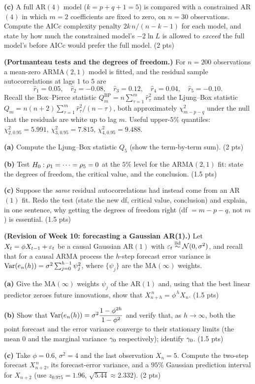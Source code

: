 \documentclass[11pt]{article}
\begin{document}
\textbf{(c)} A full AR$(4)$ model ($k=p+q+1=5$) is compared with a constrained AR$(4)$ in which $m=2$ coefficients are fixed to zero, on $n=30$ observations. Compute the AICc complexity penalty $2k\,n/(n-k-1)$ for each model, and state by how much the constrained model's $-2\ln L$ is allowed to \emph{exceed} the full model's before AICc would prefer the full model. \hfill(2 pts)
\answerpage

\textbf{(Portmanteau tests and the degrees of freedom.)} For $n=200$ observations a mean-zero ARMA$(2,1)$ model is fitted, and the residual sample autocorrelations at lags $1$ to $5$ are
\[
\hat r_1=0.05,\quad \hat r_2=-0.08,\quad \hat r_3=0.12,\quad \hat r_4=0.04,\quad \hat r_5=-0.10 .
\]
Recall the Box--Pierce statistic $Q_m^{\mathrm{BP}}=n\sum_{\tau=1}^m\hat r_\tau^2$ and the Ljung--Box statistic $Q_m=n(n+2)\sum_{\tau=1}^m\hat r_\tau^2/(n-\tau)$, both approximately $\chi^2_{m-p-q}$ under the null that the residuals are white up to lag $m$. Useful upper-$5\%$ quantiles: $\chi^2_{2,0.95}=5.991$, $\chi^2_{3,0.95}=7.815$, $\chi^2_{4,0.95}=9.488$.

\textbf{(a)} Compute the Ljung--Box statistic $Q_5$ (show the term-by-term sum). \hfill(2 pts)

\textbf{(b)} Test $H_0:\rho_1=\cdots=\rho_5=0$ at the $5\%$ level for the ARMA$(2,1)$ fit: state the degrees of freedom, the critical value, and the conclusion. \hfill(1.5 pts)

\textbf{(c)} Suppose the \emph{same} residual autocorrelations had instead come from an AR$(1)$ fit. Redo the test (state the new df, critical value, conclusion) and explain, in one sentence, why getting the degrees of freedom right (df $=m-p-q$, not $m$) is essential. \hfill(1.5 pts)
\answerpage

\textbf{(Revision of Week 10: forecasting a Gaussian AR(1).)} Let $X_t=\phi X_{t-1}+\varepsilon_t$ be a causal Gaussian AR$(1)$ with $\varepsilon_t\overset{\text{iid}}{\sim}\mathcal N(0,\sigma^2)$, and recall that for a causal ARMA process the $h$-step forecast error variance is $\operatorname{Var}(e_n(h))=\sigma^2\sum_{j=0}^{h-1}\psi_j^2$, where $\{\psi_j\}$ are the $\mathrm{MA}(\infty)$ weights.

\textbf{(a)} Give the $\mathrm{MA}(\infty)$ weights $\psi_j$ of the AR$(1)$ and, using that the best linear predictor zeroes future innovations, show that $X^{\,n}_{n+h}=\phi^{\,h}X_n$. \hfill(1.5 pts)

\textbf{(b)} Show that $\operatorname{Var}(e_n(h))=\sigma^2\dfrac{1-\phi^{2h}}{1-\phi^2}$ and verify that, as $h\to\infty$, both the point forecast and the error variance converge to their stationary limits (the mean $0$ and the marginal variance $\gamma_0$ respectively); identify $\gamma_0$. \hfill(1.5 pts)

\textbf{(c)} Take $\phi=0.6$, $\sigma^2=4$ and the last observation $X_n=5$. Compute the two-step forecast $X^{\,n}_{n+2}$, its forecast-error variance, and a $95\%$ Gaussian prediction interval for $X_{n+2}$ (use $z_{0.975}=1.96$, $\sqrt{5.44}\approx2.332$). \hfill(2 pts)
\answerpage
\end{document}
